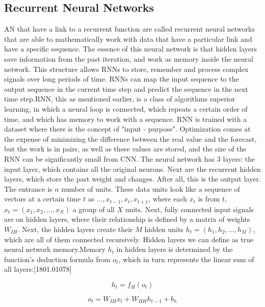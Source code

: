 \subsection{Recurrent Neural Networks}\label{sec:3.8.2}
\vspace{-0.5cm}
\noindent AN that have a link to a recurrent function are called recurrent neural networks that are able to mathematically work with data that have a particular link and have a specific sequence. The essence of this neural network is that hidden layers save information from the past iteration, and work as memory inside the neural network. This structure allows RNNs to store, remember and process complex signals over long periods of time. RNNs can map the input sequence to the output sequence in the current time step and predict the sequence in the next time step.RNN, this as mentioned earlier, is a class of algorithms superior learning, in which a neural loop is connected, which repeats a certain order of time, and which has memory to work with a sequence. RNN is trained with a dataset where there is the concept of "input - purpose". Optimization comes at the expense of minimizing the difference between the real value and the forecast, but the work is in pairs, as well as these values are stored, and the size of the RNN can be significantly small from CNN.
The neural network has 3 layers: the input layer, which contains all the original neurons. Next are the recurrent hidden layers, which store the past weight and changes. After all, this is the output layer. The entrance is $n$ number of units. These data units look like a sequence of vectors at a certain time $t$ as ${...,x_{t-1},x_t,x_{t+1}}$, where each $x_t$ is from $t$, $x_t = (x_1, x_2, ...,x_N)$ a group of all $X$ units. Next, fully connected input signals are on hidden layers, where their relationship is defined by a matrix of weights $W_{IH}$. Next, the hidden layers create their $M$ hidden units $h_t = (h_1, h_2,...,h_M)$, which are all of them connected recursively. Hidden layers we can define as true neural network memory.Memory $h_t$ in hidden layers is determined by the function's deduction formula from $o_t$, which in turn represents the linear sum of all layers:[1801.01078]

\begin{equation}
	h_t = f_H(o_t)
\end{equation}

\begin{equation}
	o_t = W_{IH}x_t + W_{HH}h_{t-1} + b_h
\end{equation}

